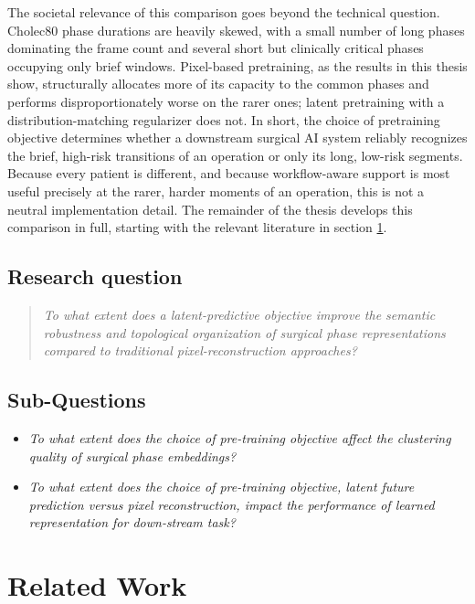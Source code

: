 \documentclass[11pt, a4paper]{article}
\begin{document}
The societal relevance of this comparison goes beyond the technical question. Cholec80 phase durations are heavily skewed, with a small number of long phases dominating the frame count and several short but clinically critical phases occupying only brief windows. Pixel-based pretraining, as the results in this thesis show, structurally allocates more of its capacity to the common phases and performs disproportionately worse on the rarer ones; latent pretraining with a distribution-matching regularizer does not. In short, the choice of pretraining objective determines whether a downstream surgical AI system reliably recognizes the brief, high-risk transitions of an operation or only its long, low-risk segments. Because every patient is different, and because workflow-aware support is most useful precisely at the rarer, harder moments of an operation, this is not a neutral implementation detail. The remainder of the thesis develops this comparison in full, starting with the relevant literature in section \ref{sec:related}.
\subsection{Research question}

\begin{quote}
\emph{To what extent does a latent-predictive objective improve the semantic robustness and topological organization of surgical phase representations compared to traditional pixel-reconstruction approaches?}
\end{quote}

\subsection{Sub-Questions}

\begin{itemize}
\item[SQ1] \emph{To what extent does the choice of pre-training objective affect the clustering quality of surgical phase embeddings?}
\item[SQ2] \emph{To what extent does the choice of pre-training objective, latent future prediction versus pixel reconstruction, impact the performance of learned representation for down-stream task?}
\end{itemize}

\section{Related Work} \label{sec:related}
\end{document}
